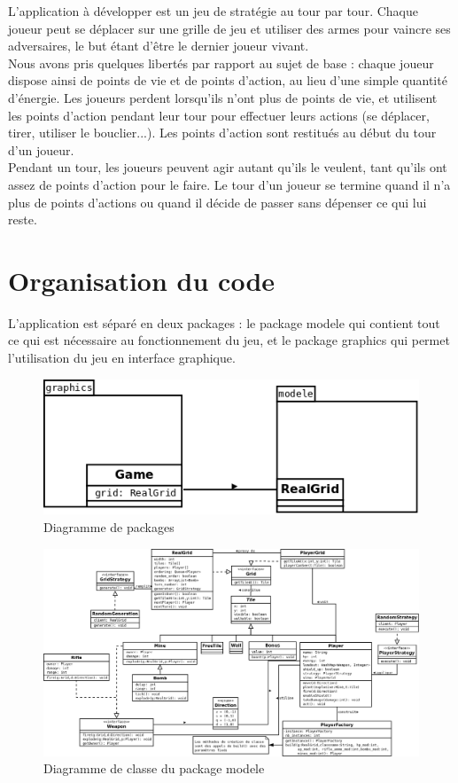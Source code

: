 \documentclass[a4paper,12pt]{article} %
\begin{document}
L'application à développer est un jeu de stratégie au tour par tour. Chaque joueur peut se déplacer sur une grille de jeu et utiliser des armes pour vaincre ses adversaires, le but étant d'être le dernier joueur vivant.\\
Nous avons pris quelques libertés par rapport au sujet de base : chaque joueur dispose ainsi de points de vie et de points d'action, au lieu d'une simple quantité d'énergie.
Les joueurs perdent lorsqu'ils n'ont plus de points de vie, et utilisent les points d'action pendant leur tour pour effectuer leurs actions (se déplacer, tirer, utiliser le bouclier...). Les points d'action sont restitués au début du tour d'un joueur.\\
Pendant un tour, les joueurs peuvent agir autant qu'ils le veulent, tant qu'ils ont assez de points d'action pour le faire. Le tour d'un joueur se termine quand il n'a plus de points d'actions ou quand il décide de passer sans dépenser ce qui lui reste.

\section*{Organisation du code}

L'application est séparé en deux packages : le package modele qui contient tout ce qui est nécessaire au fonctionnement du jeu, et le package graphics qui permet l'utilisation du jeu en interface graphique.

\begin{figure}[!h]
\centering
\includegraphics[scale=0.5]{images/packages.png}
\caption{Diagramme de packages}
\end{figure}

\begin{figure}[!h]
\centering
\includegraphics[scale=0.33]{images/modele.png}
\caption{Diagramme de classe du package modele}
\end{figure}
\end{document}
